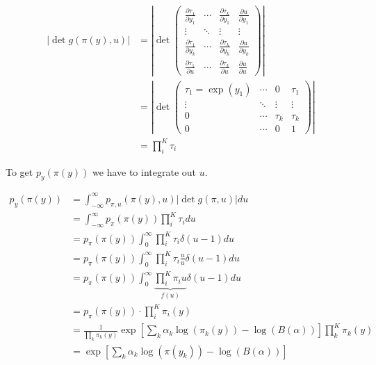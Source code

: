 \begin{subequations}
\begin{align}
	|\det g(\pi(y), u)| &= \left|\det\begin{pmatrix}
		\frac{\partial \tau_1}{\partial y_1} & \cdots & \frac{\partial \tau_k}{\partial y_1} & \frac{\partial u}{\partial y_1} \\
		\vdots & \ddots & \vdots & \vdots \\
		\frac{\partial \tau_1}{\partial y_k} & \cdots & \frac{\partial \tau_k}{\partial y_k} & \frac{\partial u}{\partial y_k} \\
		\frac{\partial \tau_1}{\partial u} & \cdots & \frac{\partial \tau_k}{\partial u} & \frac{\partial u}{\partial u}
	\end{pmatrix} \right| \\
	&= \left|\det\begin{pmatrix}
	\tau_1 = \exp(y_1) & \cdots & 0 & \tau_1 \\
	\vdots & \ddots & \vdots & \vdots \\
	0 & \cdots & \tau_k & \tau_k \\
	0 & \cdots & 0 & 1
	\end{pmatrix} \right| \\
	&= \prod_i^{K} \tau_i 
\end{align}
\end{subequations}

To get $p_y(\pi(y))$ we have to integrate out $u$. 

\begin{subequations}
\begin{align}
	p_y(\pi(y)) &=\int_{-\infty}^{\infty} p_{\pi, u}(\pi(y), u) |\det g(\pi, u)| du \\
	&= \int_{-\infty}^{\infty} p_{\pi}(\pi(y))  \prod_i^{K} \tau_i  du \\
	&= p_{\pi}(\pi(y)) \int_{0}^{\infty}  \prod_i^{K} \tau_i \delta(u-1) du \\
	&= p_{\pi}(\pi(y)) \int_{0}^{\infty}  \prod_i^{K} \tau_i \frac{u}{u} \delta(u-1) du \\
	&= p_{\pi}(\pi(y)) \int_{0}^{\infty}  \underbrace{\prod_i^{K} \pi_i u}_{f(u)} \delta(u-1) du \\
	&= p_{\pi}(\pi(y)) \cdot \prod_i^{K} \pi_i(y) \\
	&= \frac{1}{\prod_k \pi_k(y)} \exp\left[\sum_k\alpha_k\log(\pi_k(y)) - \log(B(\alpha))\right] \prod_k^{K} \pi_k(y) \\
	&= \exp\left[\sum_k\alpha_k\log(\pi(y_k)) - \log(B(\alpha))\right]
\end{align}
\end{subequations}

